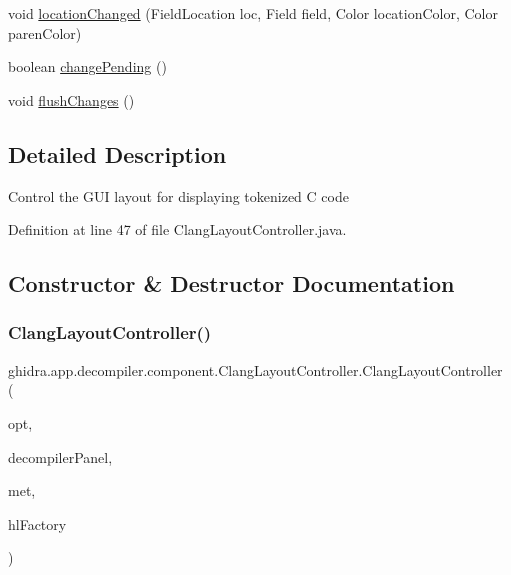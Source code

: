 \begin{DoxyCompactItemize}
\item 
void \mbox{\hyperlink{classghidra_1_1app_1_1decompiler_1_1component_1_1_clang_layout_controller_a1847e4eb2ab8c045d8267aab7edf16ec}{location\+Changed}} (Field\+Location loc, Field field, Color location\+Color, Color paren\+Color)
\item 
boolean \mbox{\hyperlink{classghidra_1_1app_1_1decompiler_1_1component_1_1_clang_layout_controller_a50c6c520d718f12994f5f8b4816805ce}{change\+Pending}} ()
\item 
void \mbox{\hyperlink{classghidra_1_1app_1_1decompiler_1_1component_1_1_clang_layout_controller_ae165a9dc620fbb83ddb250c368d2f7fd}{flush\+Changes}} ()
\end{DoxyCompactItemize}


\subsection{Detailed Description}
Control the G\+UI layout for displaying tokenized C code 

Definition at line 47 of file Clang\+Layout\+Controller.\+java.



\subsection{Constructor \& Destructor Documentation}
\mbox{\label{classghidra_1_1app_1_1decompiler_1_1component_1_1_clang_layout_controller_a80919e1f9ac07f62481a8664da049bc1}} 
\subsubsection{\texorpdfstring{ClangLayoutController()}{ClangLayoutController()}}
{\footnotesize\ttfamily ghidra.\+app.\+decompiler.\+component.\+Clang\+Layout\+Controller.\+Clang\+Layout\+Controller (\begin{DoxyParamCaption}\item[{\mbox{\hyperlink{classghidra_1_1app_1_1decompiler_1_1_decompile_options}{Decompile\+Options}}}]{opt,  }\item[{\mbox{\hyperlink{classghidra_1_1app_1_1decompiler_1_1component_1_1_decompiler_panel}{Decompiler\+Panel}}}]{decompiler\+Panel,  }\item[{Font\+Metrics}]{met,  }\item[{Highlight\+Factory}]{hl\+Factory }\end{DoxyParamCaption})\hspace{0.3cm}{\ttfamily [inline]}}



